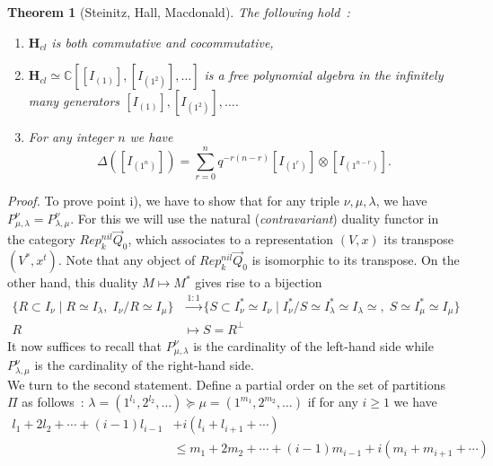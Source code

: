 \documentclass[a4paper,10pt]{amsart}
\def\H{\mathbf{H}}
\def\C{\mathbb{C}}
\newtheorem{theo}{\bf{Theorem}}[section]
\numberwithin{equation}{section}
\begin{document}
\begin{theo}[Steinitz, Hall, Macdonald]\label{T:Steinitz} The following hold~:
\begin{enumerate}
\item[i)] $\H_{cl}$ is both commutative and cocommutative,
\item[ii)] $\H_{cl} \simeq \C[[I_{(1)}], [I_{(1^2)}], \ldots ]$ is a free polynomial algebra in the infinitely many generators $[I_{(1)}], [I_{(1^2)}], \ldots$.
\item[iii)] For any integer $n$ we have
\begin{equation}\label{E:coupcoup}
\Delta ([I_{(1^n)}])=\sum_{r=0}^n q^{-r(n-r)} [I_{(1^r)}] \otimes [I_{(1^{n-r})}].
\end{equation}
\end{enumerate}
\end{theo}
\noindent
\textit{Proof.} To prove point i), we have to show that for any triple $\nu, \mu, \lambda$, we have
$P^{\nu}_{\mu,\lambda}=P^{\nu}_{\lambda,\mu}$. For this we will use the natural (\textit{contravariant}) duality functor in the category $Rep^{nil}_k\vec{Q}_0$, which associates to a representation $(V,x)$ its transpose
$(V^*, x^t)$. Note that any object of $Rep^{nil}_k\vec{Q}_0$ is isomorphic to its transpose. On the other hand, this duality $M \mapsto M^*$ gives rise to a bijection
\begin{align*}
\{R \subset I_{\nu}\;|\; R \simeq I_{\lambda},\; I_{\nu}/R \simeq I_{\mu} \}&\stackrel{1:1}{\longrightarrow}
\{S \subset I_{\nu}^* \simeq I_{\nu}\;|\; I_{\nu}^*/S \simeq I_{\lambda}^* \simeq I_{\lambda} \simeq,\; S \simeq I_{\mu}^* \simeq I_{\mu}\}\\
R & \mapsto S =R^{\perp}
\end{align*}
It now suffices to recall that $P^{\nu}_{\mu,\lambda}$ is the cardinality of the left-hand side while $P^{\nu}_{\lambda,\mu}$ is the cardinality of the right-hand side.\\
We turn to the second statement. Define a partial order on the set of partitions $\Pi$ as follows~:
$\lambda=(1^{l_1}, 2^{l_2}, \ldots ) \succeq \mu=(1^{m_1}, 2^{m_2}, \ldots)$
if for any $i \geq 1$ we have
\begin{equation*}
\begin{split}
l_1+2l_2 + \cdots + (i-1)l_{i-1}&+ i(l_i + l_{i+1} + \cdots)\\
& \leq m_1+2m_2 + \cdots + (i-1)m_{i-1}+ i(m_i + m_{i+1} + \cdots)
\end{split}
\end{equation*}
\end{document}
